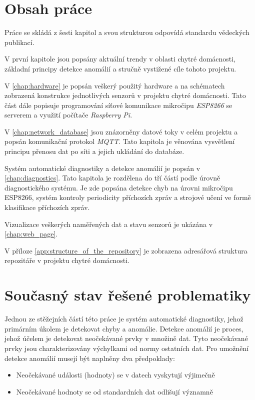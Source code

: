 \section*{Obsah práce} \label{sec:thesis_outline}
Práce se skládá z šesti kapitol a svou strukturou odpovídá standardu vědeckých publikací. \par
V první kapitole jsou popsány aktuální trendy v oblasti chytré domácnosti, základní principy detekce anomálií a stručně vystižené cíle tohoto projektu. \par
V \cref{chap:hardware} je popsán veškerý použitý hardware a na schématech zobrazená konstrukce jednotlivých senzorů v projektu chytré domácnosti. Tato část dále popisuje programování síťové komunikace mikročipu \textit{ESP8266} se serverem a využití počítače \textit{Raspberry Pi}. \par 
V \cref{chap:network_database} jsou znázorněny datové toky v celém projektu a popsán komunikační protokol \textit{MQTT}. Tato kapitola je věnována vysvětlení principu přenosu dat po síti a jejich ukládání do databáze. \par
Systém automatické diagnostiky a detekce anomálií je popsán v \cref{chap:diagnostics}. Tato kapitola je rozdělena do tří částí podle úrovně diagnostického systému. Je zde popsána detekce chyb na úrovni mikročipu ESP8266, systém kontroly periodicity příchozích zpráv a strojové učení ve formě klasifikace příchozích zpráv. \par
Vizualizace veškerých naměřených dat a stavu senzorů je ukázána v \cref{chap:web_page}. \par
V příloze \ref{app:structure_of_the_repository} je zobrazena adresářová struktura repozitáře v projektu chytré domácnosti. 

\section*{Současný stav řešené problematiky} \label{sec:state_of_the_art}
Jednou ze stěžejních částí této práce je systém automatické diagnostiky, jehož primárním úkolem je detekovat chyby a anomálie. Detekce anomálií je proces, jehož účelem je detekovat neočekávané prvky v množině dat. Tyto neočekávané prvky jsou charakterizovány výchylkami od normy ostatních dat. Pro umožnění detekce anomálií musejí být naplněny dva předpoklady: 

\begin{itemize}
	\item Neočekávané události (hodnoty) se v datech vyskytují výjimečně
	\item Neočekávané hodnoty se od standardních dat odlišují významně 
\end{itemize}

